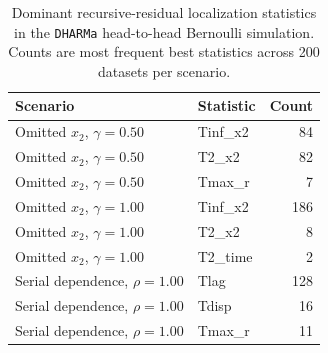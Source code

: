 \begin{table}[H]
\centering
\caption{Dominant recursive-residual localization statistics in the \texttt{DHARMa} head-to-head Bernoulli simulation. Counts are most frequent best statistics across 200 datasets per scenario.}
\label{tab:dharma-head-to-head-beststat}
\begin{tabular}{llr}
\toprule
Scenario & Statistic & Count \\
\midrule
Omitted $x_2$, $\gamma=0.50$ & Tinf\_x2 & 84 \\
Omitted $x_2$, $\gamma=0.50$ & T2\_x2 & 82 \\
Omitted $x_2$, $\gamma=0.50$ & Tmax\_r & 7 \\
Omitted $x_2$, $\gamma=1.00$ & Tinf\_x2 & 186 \\
Omitted $x_2$, $\gamma=1.00$ & T2\_x2 & 8 \\
Omitted $x_2$, $\gamma=1.00$ & T2\_time & 2 \\
Serial dependence, $\rho=1.00$ & Tlag & 128 \\
Serial dependence, $\rho=1.00$ & Tdisp & 16 \\
Serial dependence, $\rho=1.00$ & Tmax\_r & 11 \\
\bottomrule
\end{tabular}
\end{table}
